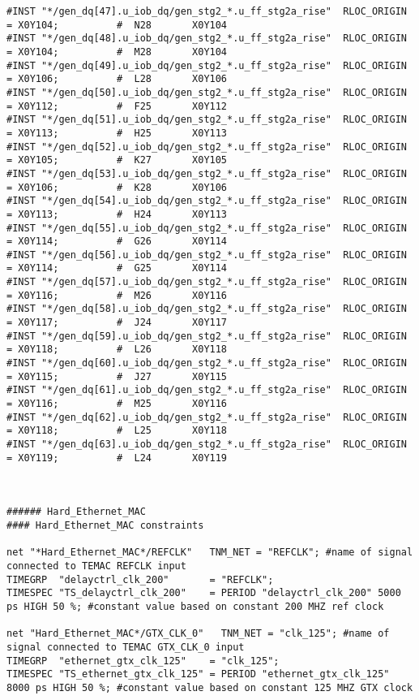 \begin{verbatim}
#INST "*/gen_dq[47].u_iob_dq/gen_stg2_*.u_ff_stg2a_rise"  RLOC_ORIGIN = X0Y104;          #  N28       X0Y104   
#INST "*/gen_dq[48].u_iob_dq/gen_stg2_*.u_ff_stg2a_rise"  RLOC_ORIGIN = X0Y104;          #  M28       X0Y104   
#INST "*/gen_dq[49].u_iob_dq/gen_stg2_*.u_ff_stg2a_rise"  RLOC_ORIGIN = X0Y106;          #  L28       X0Y106   
#INST "*/gen_dq[50].u_iob_dq/gen_stg2_*.u_ff_stg2a_rise"  RLOC_ORIGIN = X0Y112;          #  F25       X0Y112   
#INST "*/gen_dq[51].u_iob_dq/gen_stg2_*.u_ff_stg2a_rise"  RLOC_ORIGIN = X0Y113;          #  H25       X0Y113   
#INST "*/gen_dq[52].u_iob_dq/gen_stg2_*.u_ff_stg2a_rise"  RLOC_ORIGIN = X0Y105;          #  K27       X0Y105   
#INST "*/gen_dq[53].u_iob_dq/gen_stg2_*.u_ff_stg2a_rise"  RLOC_ORIGIN = X0Y106;          #  K28       X0Y106   
#INST "*/gen_dq[54].u_iob_dq/gen_stg2_*.u_ff_stg2a_rise"  RLOC_ORIGIN = X0Y113;          #  H24       X0Y113   
#INST "*/gen_dq[55].u_iob_dq/gen_stg2_*.u_ff_stg2a_rise"  RLOC_ORIGIN = X0Y114;          #  G26       X0Y114   
#INST "*/gen_dq[56].u_iob_dq/gen_stg2_*.u_ff_stg2a_rise"  RLOC_ORIGIN = X0Y114;          #  G25       X0Y114   
#INST "*/gen_dq[57].u_iob_dq/gen_stg2_*.u_ff_stg2a_rise"  RLOC_ORIGIN = X0Y116;          #  M26       X0Y116   
#INST "*/gen_dq[58].u_iob_dq/gen_stg2_*.u_ff_stg2a_rise"  RLOC_ORIGIN = X0Y117;          #  J24       X0Y117   
#INST "*/gen_dq[59].u_iob_dq/gen_stg2_*.u_ff_stg2a_rise"  RLOC_ORIGIN = X0Y118;          #  L26       X0Y118   
#INST "*/gen_dq[60].u_iob_dq/gen_stg2_*.u_ff_stg2a_rise"  RLOC_ORIGIN = X0Y115;          #  J27       X0Y115   
#INST "*/gen_dq[61].u_iob_dq/gen_stg2_*.u_ff_stg2a_rise"  RLOC_ORIGIN = X0Y116;          #  M25       X0Y116   
#INST "*/gen_dq[62].u_iob_dq/gen_stg2_*.u_ff_stg2a_rise"  RLOC_ORIGIN = X0Y118;          #  L25       X0Y118   
#INST "*/gen_dq[63].u_iob_dq/gen_stg2_*.u_ff_stg2a_rise"  RLOC_ORIGIN = X0Y119;          #  L24       X0Y119   



###### Hard_Ethernet_MAC
#### Hard_Ethernet_MAC constraints

net "*Hard_Ethernet_MAC*/REFCLK"   TNM_NET = "REFCLK"; #name of signal connected to TEMAC REFCLK input
TIMEGRP  "delayctrl_clk_200"       = "REFCLK";
TIMESPEC "TS_delayctrl_clk_200"    = PERIOD "delayctrl_clk_200" 5000 ps HIGH 50 %; #constant value based on constant 200 MHZ ref clock

net "Hard_Ethernet_MAC*/GTX_CLK_0"   TNM_NET = "clk_125"; #name of signal connected to TEMAC GTX_CLK_0 input
TIMEGRP  "ethernet_gtx_clk_125"    = "clk_125";
TIMESPEC "TS_ethernet_gtx_clk_125" = PERIOD "ethernet_gtx_clk_125" 8000 ps HIGH 50 %; #constant value based on constant 125 MHZ GTX clock


\end{verbatim}
